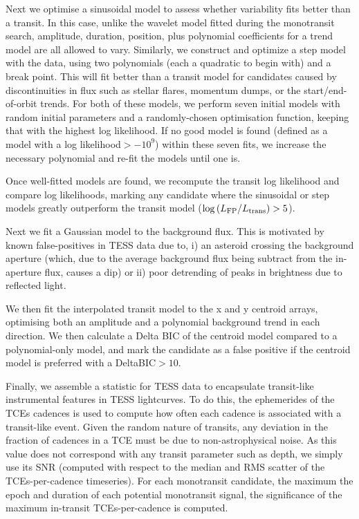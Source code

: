 \documentclass{article}
\begin{document}
Next we optimise a sinusoidal model to assess whether variability fits better than a transit. 
In this case, unlike the wavelet model fitted during the monotransit search, amplitude, duration, position, plus polynomial coefficients for a trend model are all allowed to vary.
Similarly, we construct and optimize a step model with the data, using two polynomials (each a quadratic to begin with) and a break point. 
This will fit better than a transit model for candidates caused by discontinuities in flux such as stellar flares, momentum dumps, or the start/end-of-orbit trends.
For both of these models, we perform seven initial models with random initial parameters and a randomly-chosen optimisation function, keeping that with the highest log likelihood. 
If no good model is found (defined as a model with a log likelihood$>-10^{9}$) within these seven fits, we increase the necessary polynomial and re-fit the models until one is.

Once well-fitted models are found, we recompute the transit log likelihood and compare log likelihoods, marking any candidate where the sinusoidal or step models greatly outperform the transit model ($\log{\left({L_{\rm FP}}/{L_{\rm trans}}\right)}>5$).

Next we fit a Gaussian model to the background flux. This is motivated by known false-positives in TESS data due to, i) an asteroid crossing the background aperture (which, due to the average background flux being subtract from the in-aperture flux, causes a dip) or ii) poor detrending of peaks in brightness due to reflected light.

We then fit the interpolated transit model to the x and y centroid arrays, optimising both an amplitude and a polynomial background trend in each direction. 
We then calculate a Delta BIC of the centroid model compared to a polynomial-only model, and mark the candidate as a false positive if the centroid model is preferred with a DeltaBIC$>10$.

Finally, we assemble a statistic for TESS data to encapsulate transit-like instrumental features in TESS lightcurves. To do this, the ephemerides of the TCEs cadences is used to compute how often each cadence is associated with a transit-like event.
Given the random nature of transits, any deviation in the fraction of cadences in a TCE must be due to non-astrophysical noise.
As this value does not correspond with any transit parameter such as depth, we simply use its SNR (computed with respect to the median and RMS scatter of the TCEs-per-cadence timeseries). For each monotransit candidate, the maximum  the epoch and duration of each potential monotransit signal, the significance of the maximum in-transit TCEs-per-cadence is computed.
\end{document}
